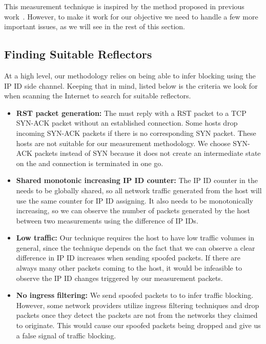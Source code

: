 This measurement technique is inspired by the method proposed in previous
work~\cite{ensafi2014detecting, pearce2017augur}.  However, to make it work for
our objective we need to handle a few more important issues, as we will
see in the rest of this section.

\subsection{Finding Suitable Reflectors}
\label{sec:methrefl}

At a high level, our methodology relies on being able to infer blocking
using the IP ID side channel. Keeping that in mind, listed below is the
criteria we look for when scanning the Internet to search for suitable
reflectors.

\begin{itemize}
    \item \textbf{RST packet generation:}
    The {} must reply with a RST packet to a TCP SYN-ACK packet without an
    established connection. Some hosts drop incoming SYN-ACK packets if there
    is no corresponding SYN packet. These hosts are not suitable for our
    measurement methodology. We choose SYN-ACK packets instead of SYN because
    it does not create an intermediate state on the {} and
    connection is terminated in one go.

    \item \textbf{Shared monotonic increasing IP ID counter:}
    The IP ID counter in the {} needs to be globally shared, so all
    network traffic generated from the host will use the same counter for IP
    ID assigning. It also needs to be monotonically increasing, so we can
    observe the number of packets generated by the host between two measurements using
    the difference of IP IDs.
    \item \textbf{Low traffic:}
    Our technique requires the host to have low traffic volumes
    in general, since the technique depends on the fact
    that we can observe a clear difference in IP ID increases when sending
    spoofed packets. If there are always many other
    packets coming to the host, it would be infeasible to observe the IP ID
    changes triggered by our measurement packets.

    \item \textbf{No ingress filtering:}
    We send spoofed packets to {} to infer traffic blocking.
    However, some network providers utilize ingress filtering techniques and
    drop packets once they detect the packets are not from the networks they
    claimed to originate. This would cause our spoofed packets being dropped
    and give us a false signal of traffic blocking.


\end{itemize}
